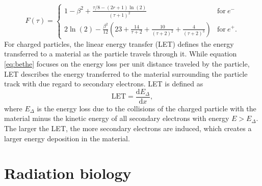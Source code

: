 \begin{equation}
F(\tau) = \begin{cases}
1 - \beta^2 + \frac{\tau/8 - (2r+1)\ln(2)}{(\tau + 1)^2} & \mathrm{for}~e^-\,\\
2\ln(2) - \frac{\beta^2}{12}\left(23 + \frac{14}{\tau + 2} + \frac{10}{(\tau + 2)^2} + \frac{4}{(\tau + 2)^3}\right)& \mathrm{for }~e^+.
\end{cases}
\end{equation}
For charged particles, the linear energy transfer (LET) defines the energy transferred to a material as the particle travels through it. While equation \ref{eq:bethe} focuses on the energy loss per unit distance traveled by the particle, LET describes the energy transferred to the material surrounding the particle track with due regard to secondary electrons. LET is defined as
\begin{equation}
\mathrm{LET} = \frac{\mathrm{d}E_\Delta}{\mathrm{d}x},
\end{equation}
where $E_\Delta$ is the energy loss due to the collisions of the charged particle with the material minus the kinetic energy of all secondary electrons with energy $E>E_\Delta$. The larger the LET, the more secondary electrons are induced, which creates a larger energy deposition in the material.
\section{Radiation biology}
